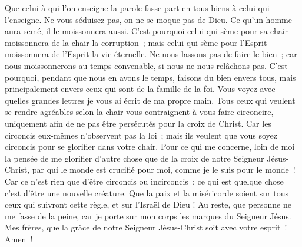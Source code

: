 \begin{multicols}{2}
Que celui à qui l'on enseigne la parole fasse part en tous biens à celui qui l'enseigne.
Ne vous séduisez pas, on ne se moque pas de Dieu. Ce qu'un homme aura semé, il le moissonnera aussi.
C'est pourquoi celui qui sème pour sa chair moissonnera de la chair la corruption~; mais celui qui sème pour l'Esprit moissonnera de l'Esprit la vie éternelle.
Ne nous lassons pas de faire le bien~; car nous moissonnerons au temps convenable, si nous ne nous relâchons pas.
C'est pourquoi, pendant que nous en avons le temps, faisons du bien envers tous, mais principalement envers ceux qui sont de la famille de la foi.
Vous voyez avec quelles grandes lettres je vous ai écrit de ma propre main.
Tous ceux qui veulent se rendre agréables selon la chair vous contraignent à vous faire circoncire, uniquement afin de ne pas être persécutés pour la croix de Christ.
Car les circoncis eux-mêmes n'observent pas la loi~; mais ils veulent que vous soyez circoncis pour se glorifier dans votre chair.
Pour ce qui me concerne, loin de moi la pensée de me glorifier d'autre chose que de la croix de notre Seigneur Jésus-Christ, par qui le monde est crucifié pour moi, comme je le suis pour le monde~!
Car ce n'est rien que d'être circoncis ou incirconcis~; ce qui est quelque chose c'est d'être une nouvelle créature.
Que la paix et la miséricorde soient sur tous ceux qui suivront cette règle, et sur l'Israël de Dieu !
Au reste, que personne ne me fasse de la peine, car je porte sur mon corps les marques du Seigneur Jésus.
Mes frères, que la grâce de notre Seigneur Jésus-Christ soit avec votre esprit~! Amen~!
\PPE{}
\end{multicols}
